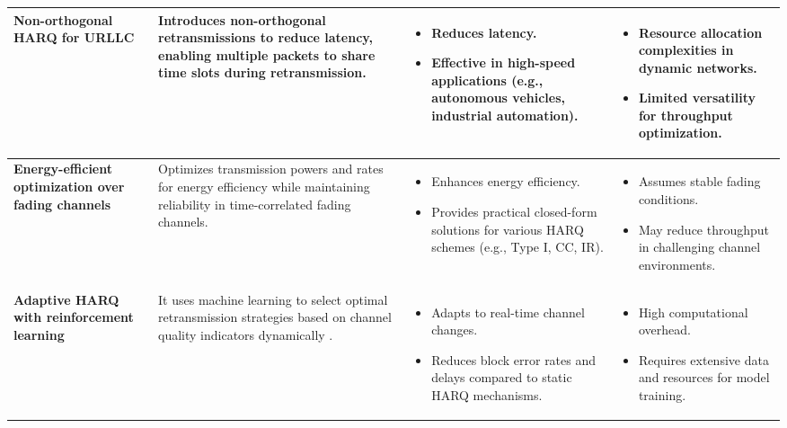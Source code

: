 \documentclass[a4paper,10pt]{article}
\begin{document}
\begin{enumerate}
\begin{longtable}{|>{\centering\arraybackslash}m{3.2cm}|>{\centering\arraybackslash}m{4.3cm}|>{\centering\arraybackslash}m{3.75cm}|>{\centering\arraybackslash}m{3.75cm}|}
\textbf{Non-orthogonal HARQ for URLLC} & Introduces non-orthogonal retransmissions to reduce latency, enabling multiple packets to share time slots during retransmission. & 
\begin{itemize}
    \item Reduces latency.
    \item Effective in high-speed applications (e.g., autonomous vehicles, industrial automation).
\end{itemize} & 
\begin{itemize}
    \item Resource allocation complexities in dynamic networks.
    \item Limited versatility for throughput optimization.
\end{itemize} \\ 
\hline

\textbf{Energy-efficient optimization over fading channels} & Optimizes transmission powers and rates for energy efficiency while maintaining reliability in time-correlated fading channels. & 
\begin{itemize}
    \item Enhances energy efficiency.
    \item Provides practical closed-form solutions for various HARQ schemes (e.g., Type I, CC, IR).
\end{itemize} & 
\begin{itemize}
    \item Assumes stable fading conditions.
    \item May reduce throughput in challenging channel environments.
\end{itemize} \\ 
\hline

\textbf{Adaptive HARQ with reinforcement learning} & It uses machine learning to select optimal retransmission strategies based on channel quality indicators dynamically . & 
\begin{itemize}
    \item Adapts to real-time channel changes.
    \item Reduces block error rates and delays compared to static HARQ mechanisms.
\end{itemize} & 
\begin{itemize}
    \item High computational overhead.
    \item Requires extensive data and resources for model training.
\end{itemize} \\ 
\hline


\end{longtable}
\end{enumerate}
\end{document}
